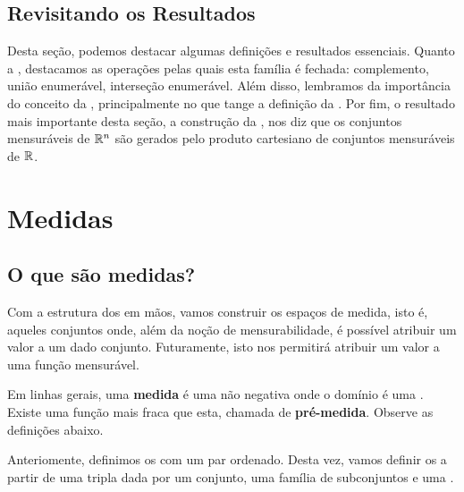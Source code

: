 \productSigmaAlgebraOfRn

\subsection*{Revisitando os Resultados}
Desta seção, podemos destacar algumas definições e resultados essenciais. Quanto a , destacamos as operações pelas quais esta família é fechada: complemento, união enumerável, interseção enumerável. Além disso, lembramos da importância do conceito da , principalmente no que tange a definição da . Por fim, o resultado mais importante desta seção, a construção da , nos diz que os conjuntos mensuráveis de $\mathbb{R}^n$ são gerados pelo produto cartesiano de conjuntos mensuráveis de $\mathbb{R}$.




\section{Medidas}

\subsection*{O que são medidas?}
Com a estrutura dos  em mãos, vamos construir os espaços de medida, isto é, aqueles conjuntos onde, além da noção de mensurabilidade, é possível atribuir um valor a um dado conjunto. Futuramente, isto nos permitirá atribuir um valor a uma função mensurável.

Em linhas gerais, uma \textbf{medida} é uma  não negativa onde o domínio é uma . Existe uma função mais fraca que esta, chamada de \textbf{pré-medida}. Observe as definições abaixo.

\preMeasure
\measure

Anteriomente, definimos os  com um par ordenado. Desta vez, vamos definir os  a partir de uma tripla dada por um conjunto, uma família de subconjuntos e uma .

\measureSpace

